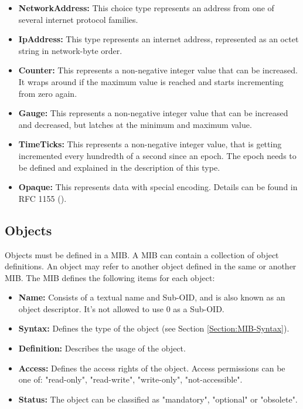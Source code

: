 \begin{minipage}{\textwidth}
\begin{itemize}
    \item \textbf{NetworkAddress:} This choice type represents an address from one of several internet protocol families.
    \item \textbf{IpAddress:} This type represents an internet address, represented as an octet string in network-byte order.
    \item \textbf{Counter:} This represents a non-negative integer value that can be increased. It wraps around if the maximum value is reached and starts incrementing from zero again.
    \item \textbf{Gauge:} This represents a non-negative integer value that can be increased and decreased, but latches at the minimum and maximum value.
    \item \textbf{TimeTicks:} This represents a non-negative integer value, that is getting incremented every hundredth of a second since an epoch. The epoch needs to be defined and explained in the description of this type.
    \item \textbf{Opaque:} This represents data with special encoding. Details can be found in RFC 1155 (\cite{RFC:RFC1155:1990}).
\end{itemize}
\end{minipage}


\subsection{Objects}
\label{Section:MIB-Managed_Objects}

Objects must be defined in a MIB. A MIB can contain a collection of object definitions. An object may refer to another object defined in the same or another MIB. The MIB defines the following items for each object:

\begin{minipage}{\textwidth}
\begin{itemize}
    \item \textbf{Name:} Consists of a textual name and Sub-OID, and is also known as an object descriptor. It's not allowed to use 0 as a Sub-OID.
    \item \textbf{Syntax:} Defines the type of the object (see Section \ref{Section:MIB-Syntax}).
    \item \textbf{Definition:} Describes the usage of the object.
    \item \textbf{Access:} Defines the access rights of the object. Access permissions can be one of: "read-only", "read-write", "write-only", "not-accessible".
    \item \textbf{Status:} The object can be classified as "mandatory", "optional" or "obsolete".
\end{itemize}
\end{minipage}


